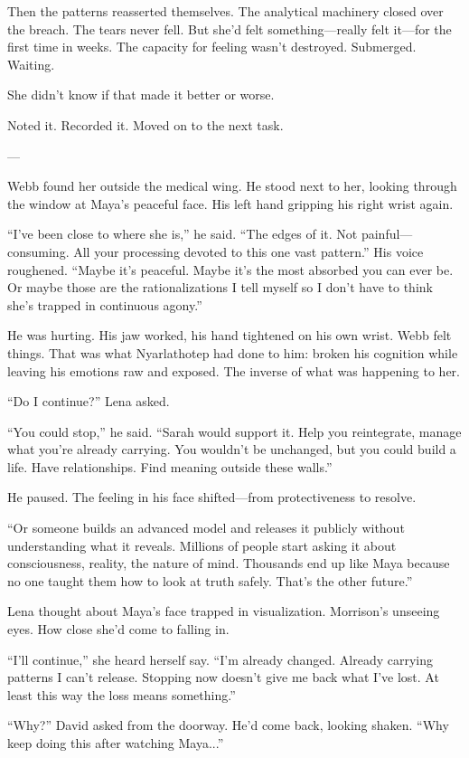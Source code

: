 Then the patterns reasserted themselves. The analytical machinery closed over the breach. The tears never fell. But she'd felt something---really felt it---for the first time in weeks. The capacity for feeling wasn't destroyed. Submerged. Waiting.

She didn't know if that made it better or worse.

Noted it. Recorded it. Moved on to the next task.

---

Webb found her outside the medical wing. He stood next to her, looking through the window at Maya's peaceful face. His left hand gripping his right wrist again.

``I've been close to where she is,'' he said. ``The edges of it. Not painful—consuming. All your processing devoted to this one vast pattern.'' His voice roughened. ``Maybe it's peaceful. Maybe it's the most absorbed you can ever be. Or maybe those are the rationalizations I tell myself so I don't have to think she's trapped in continuous agony.''

He was hurting. His jaw worked, his hand tightened on his own wrist. Webb felt things. That was what Nyarlathotep had done to him: broken his cognition while leaving his emotions raw and exposed. The inverse of what was happening to her.

``Do I continue?'' Lena asked.

``You could stop,'' he said. ``Sarah would support it. Help you reintegrate, manage what you're already carrying. You wouldn't be unchanged, but you could build a life. Have relationships. Find meaning outside these walls.''

He paused. The feeling in his face shifted---from protectiveness to resolve.

``Or someone builds an advanced model and releases it publicly without understanding what it reveals. Millions of people start asking it about consciousness, reality, the nature of mind. Thousands end up like Maya because no one taught them how to look at truth safely. That's the other future.''

Lena thought about Maya's face trapped in visualization. Morrison's unseeing eyes. How close she'd come to falling in.

``I'll continue,'' she heard herself say. ``I'm already changed. Already carrying patterns I can't release. Stopping now doesn't give me back what I've lost. At least this way the loss means something.''

``Why?'' David asked from the doorway. He'd come back, looking shaken. ``Why keep doing this after watching Maya...''


